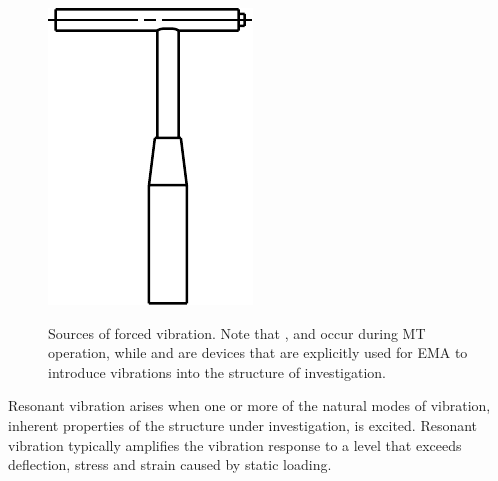 \begin{figure}[!htb]
{        \includegraphics[scale=0.7]{figures/ema/vibration_sources/impulse_hammer_scheme}}
    \endgroup
    \hspace{0em}
    \caption[Forced Vibration Sources]{Sources of forced vibration. Note that ,  and  occur during \ac{MT} operation, while  and  are devices that are explicitly used for \ac{EMA} to introduce vibrations into the structure of investigation.}
    \label{fig:vibration_sources}
\end{figure}

Resonant vibration arises when one or more of the natural modes of vibration, inherent properties of the structure under investigation, is excited. Resonant vibration typically amplifies the vibration response to a level that exceeds deflection, stress and strain caused by static loading.

